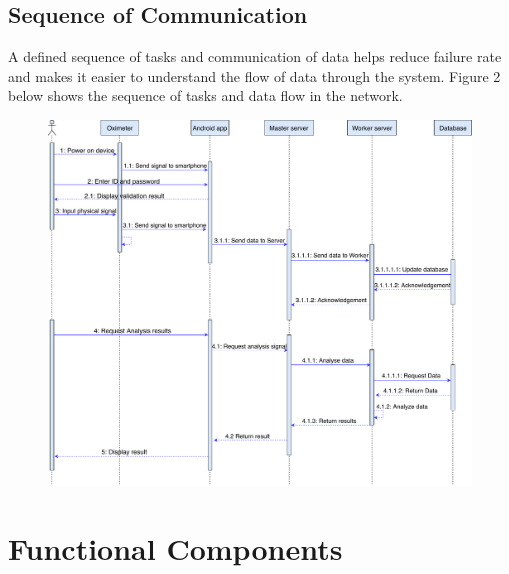 \documentclass[10pt,journal,compsoc]{IEEEtran}
\begin{document}
\subsection{Sequence of Communication}
A defined sequence of tasks and communication of data helps reduce failure rate and makes it easier to understand the flow of data through the system. Figure 2 below shows the sequence of tasks and data flow in the network.
\begin{figure}[h]
\centering
\includegraphics[width=12cm]{sequence}
\end{figure}

\section{Functional Components}
\end{document}
